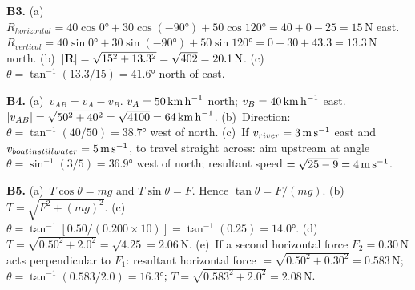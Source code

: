 \textbf{B3.}
(a)~$R_{horizontal}=40\cos0°+30\cos(-90°)+50\cos120°
=40+0-25=15\,\text{N}$ east. \quad
$R_{vertical}=40\sin0°+30\sin(-90°)+50\sin120°
=0-30+43.3=13.3\,\text{N}$ north. \quad
(b)~$|\vect{R}|=\sqrt{15^2+13.3^2}=\sqrt{402}
=20.1\,\text{N}$. \quad
(c)~$\theta=\tan^{-1}(13.3/15)=41.6°$ north of east.

\textbf{B4.}
(a)~$v_{AB}=v_A-v_B$. $v_A=50\,\text{km\,h}^{-1}$
north; $v_B=40\,\text{km\,h}^{-1}$ east. \quad
$|v_{AB}|=\sqrt{50^2+40^2}=\sqrt{4100}=64\,\text{km\,h}^{-1}$. \quad
(b)~Direction: $\theta=\tan^{-1}(40/50)=38.7°$ west of
north. \quad
(c)~If $v_{river}=3\,\text{m\,s}^{-1}$ east and
$v_{boat in still water}=5\,\text{m\,s}^{-1}$, to travel
straight across: aim upstream at angle
$\theta=\sin^{-1}(3/5)=36.9°$ west of north; resultant
speed $=\sqrt{25-9}=4\,\text{m\,s}^{-1}$.

\textbf{B5.}
(a)~$T\cos\theta=mg$ and $T\sin\theta=F$. Hence
$\tan\theta=F/(mg)$. \quad
(b)~$T=\sqrt{F^2+(mg)^2}$. \quad
(c)~$\theta=\tan^{-1}[0.50/(0.200\times10)]
=\tan^{-1}(0.25)=14.0°$. \quad
(d)~$T=\sqrt{0.50^2+2.0^2}=\sqrt{4.25}=2.06\,\text{N}$. \quad
(e)~If a second horizontal force $F_2=0.30\,\text{N}$
acts perpendicular to $F_1$: resultant horizontal force
$=\sqrt{0.50^2+0.30^2}=0.583\,\text{N}$;
$\theta=\tan^{-1}(0.583/2.0)=16.3°$;
$T=\sqrt{0.583^2+2.0^2}=2.08\,\text{N}$.

\endgroup


